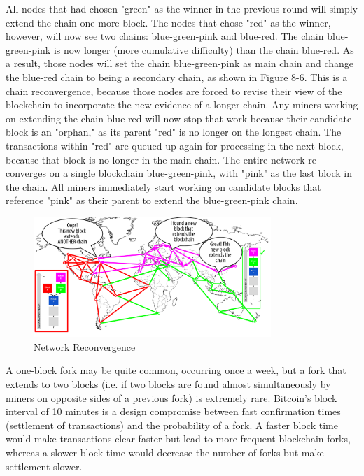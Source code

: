 \documentclass{article}
\begin{document}
    All nodes that had chosen "green" as the winner in the previous round will simply extend the chain one more block. The nodes that chose "red" as the winner, however, will now see two chains: blue-green-pink and blue-red. The chain blue-green-pink is now longer (more cumulative difficulty) than the chain blue-red. As a result, those nodes will set the chain blue-green-pink as main chain and change the blue-red chain to being a secondary chain, as shown in Figure 8-6. This is a chain reconvergence, because those nodes are forced to revise their view of the blockchain to incorporate the new evidence of a longer chain. Any miners working on extending the chain blue-red will now stop that work because their candidate block is an "orphan," as its parent "red" is no longer on the longest chain. The transactions within "red" are queued up again for processing in the next block, because that block is no longer in the main chain. The entire network re-converges on a single blockchain blue-green-pink, with "pink" as the last block in the chain. All miners immediately start working on candidate blocks that reference "pink" as their parent to extend the blue-green-pink chain.

    \begin{figure}[H]
    \centering
    \includegraphics[width=0.8\textwidth]{img/msbt_0806.png}
    \caption{Network Reconvergence}
    \end{figure}

    A one-block fork may be quite common, occurring once a week, but a fork that extends to two blocks (i.e. if two blocks are found almost simultaneously by miners on opposite sides of a previous fork) is extremely rare. Bitcoin's block interval of 10 minutes is a design compromise between fast confirmation times (settlement of transactions) and the probability of a fork. A faster block time would make transactions clear faster but lead to more frequent blockchain forks, whereas a slower block time would decrease the number of forks but make settlement slower.
\end{document}
